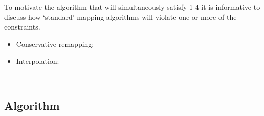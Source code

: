 To motivate the algorithm that will simultaneously satisfy 1-4 it is informative to discuss how `standard' mapping algorithms will violate one or more of the constraints.
\begin{itemize}
\item Conservative remapping: 
\item Interpolation:
\end{itemize}

{\color{red}{some text about how challenging it is to satisfy 1-3 simultaneously}}\\
\subsection{Algorithm}

